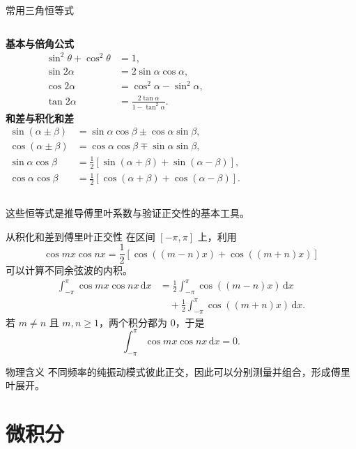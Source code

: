 \begin{frame}{常用三角恒等式}
  \scriptsize
  \begin{columns}[T]
    \textbf{基本与倍角公式}
    \begin{align*}
      \sin^2\theta+\cos^2\theta&=1,\\
      \sin2\alpha&=2\sin\alpha\cos\alpha,\\
      \cos2\alpha&=\cos^2\alpha-\sin^2\alpha,\\
      \tan2\alpha&=\frac{2\tan\alpha}{1-\tan^2\alpha}.
    \end{align*}
    \textbf{和差与积化和差}
    \begin{align*}
      \sin(\alpha\pm\beta)&=\sin\alpha\cos\beta
      \pm\cos\alpha\sin\beta,\\
      \cos(\alpha\pm\beta)&=\cos\alpha\cos\beta
      \mp\sin\alpha\sin\beta,\\
      \sin\alpha\cos\beta&=\tfrac12[\sin(\alpha+\beta)+\sin(\alpha-\beta)],\\
      \cos\alpha\cos\beta&=\tfrac12[\cos(\alpha+\beta)+\cos(\alpha-\beta)].
    \end{align*}
  \end{columns}
  \vspace{0.4em}
  这些恒等式是推导傅里叶系数与验证正交性的基本工具。
\end{frame}

\begin{frame}{从积化和差到傅里叶正交性}
  \small
  在区间 $[-\pi,\pi]$ 上，利用
  \[
    \cos mx\cos nx=
    \frac12\left[\cos((m-n)x)+\cos((m+n)x)\right]
  \]
  可以计算不同余弦波的内积。
  \begin{align*}
    \int_{-\pi}^{\pi}\cos mx\cos nx\,\mathrm{d}x
    &=\frac12\int_{-\pi}^{\pi}\cos((m-n)x)\,\mathrm{d}x\\
    &\quad+\frac12\int_{-\pi}^{\pi}\cos((m+n)x)\,\mathrm{d}x.
  \end{align*}
  若 $m\ne n$ 且 $m,n\geq1$，两个积分都为 $0$，于是
  \[
    \int_{-\pi}^{\pi}\cos mx\cos nx\,\mathrm{d}x=0.
  \]
  \begin{block}{物理含义}
    不同频率的纯振动模式彼此正交，因此可以分别测量并组合，形成傅里叶展开。
  \end{block}
\end{frame}

\section{微积分}

